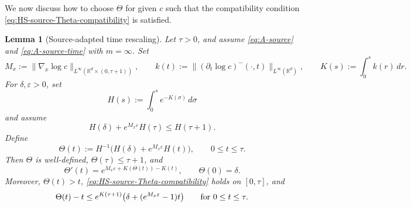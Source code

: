 \documentclass[11pt]{amsart}
\numberwithin{equation}{section}
\numberwithin{figure}{section}
\theoremstyle{plain}
\newtheorem{lem}[thm]{Lemma}
\theoremstyle{definition}
\theoremstyle{remark}
\theoremstyle{plain}
\newcommand{\norm}[1]{\lVert #1 \rVert}
\newcommand{\vep}{\varepsilon}
\def\R{\mathbb{R}}
\begin{document}
We now discuss how to choose $\Theta$ for given $c$ such that the compatibility condition \eqref{eq:HS-source-Theta-compatibility} is satisfied.
\begin{lem}[Source-adapted time rescaling]\label{lem:HS-source-envelope}
Let \(\tau>0\), and assume \eqref{eq:A-source} and \eqref{eq:A-source-time} with
\(m=\infty\).
Set
\begin{equation}\label{eq:HS-source-envelope-constants}
    M_x:=\norm{\nabla_x\log c}_{L^\infty(\R^d\times(0,\tau+1))},
    \qquad
    k(t):=\norm{(\partial_t\log c)^-(\cdot,t)}_{L^\infty(\R^d)},
    \qquad
    K(s):=\int_0^s k(r)\,dr .
\end{equation}
For
\(\delta,\vep>0\), set
\[
    H(s):=\int_0^s e^{-K(\sigma)}\,d\sigma
\]
and assume
\begin{equation}\label{eq:HS-envelope-size-condition}
    H(\delta)+e^{M_x\vep}H(\tau)\leq H(\tau+1).
\end{equation}
Define
\begin{equation}\label{eq:HS-Theta-def}
    \Theta(t):=
    H^{-1}\bigl(H(\delta)+e^{M_x\vep}H(t)\bigr),
    \qquad 0\leq t\leq \tau .
\end{equation}
Then \(\Theta\) is well-defined, \(\Theta(\tau)\leq \tau+1\), and
\begin{equation}\label{eq:HS-Theta-ode}
    \Theta'(t)=e^{M_x\vep+K(\Theta(t))-K(t)},
    \qquad
    \Theta(0)=\delta.
\end{equation}
Moreover, \(\Theta(t)>t\),
\eqref{eq:HS-source-Theta-compatibility} holds on \([0,\tau]\), and
\begin{equation}\label{eq:HS-Theta-lag-bound}
    \Theta(t)-t
    \leq e^{K(\tau+1)}
    \bigl(\delta+(e^{M_x\vep}-1)t\bigr)
    \qquad\hbox{for }0\leq t\leq \tau .
\end{equation}
\end{lem}
\end{document}
